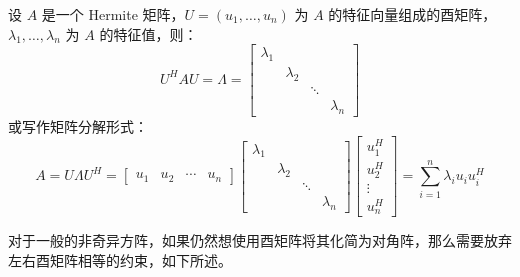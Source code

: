 \begin{theorem}
设 $A$ 是一个 Hermite 矩阵，$U=(u_1,\ldots,u_n)$ 为 $A$ 的特征向量组成的酉矩阵，$\lambda_1,\ldots,\lambda_n$ 为 $A$ 的特征值，则：
\[
    U^HAU=\Lambda=\begin{bmatrix}\lambda_1&&&\\&\lambda_2&&\\&&\ddots&\\&&&\lambda_n\end{bmatrix}
\]
或写作矩阵分解形式：
\[
    A=U\Lambda U^H=
    \begin{bmatrix}
    u_1&u_2&\cdots&u_n
    \end{bmatrix}
    \begin{bmatrix}
    \lambda_1&&&\\
    &\lambda_2&&\\
    &&\ddots&\\
    &&&\lambda_n
    \end{bmatrix}
    \begin{bmatrix}
    u_1^H\\u_2^H\\\vdots\\u_n^H
    \end{bmatrix}=\sum_{i=1}^n\lambda_iu_iu_i^H
\]
\end{theorem}

对于一般的非奇异方阵，如果仍然想使用酉矩阵将其化简为对角阵，那么需要放弃左右酉矩阵相等的约束，如下所述。

